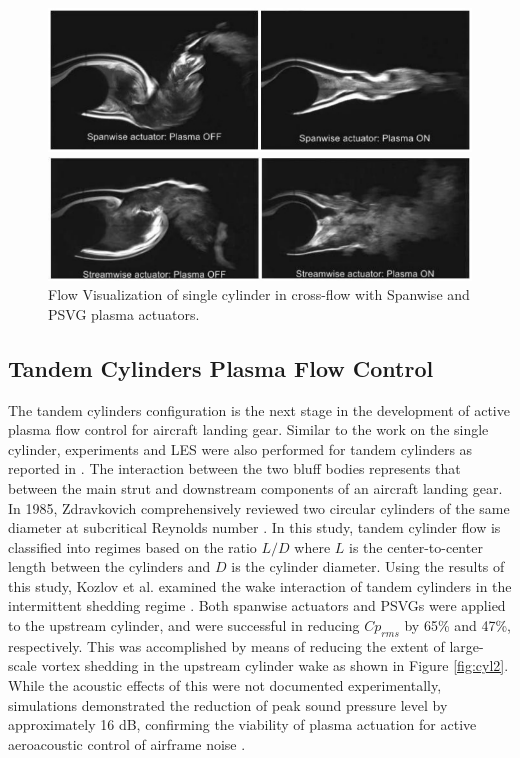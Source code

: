\begin{figure}
	\begin{center}
		\centerline{\includegraphics[scale=1.0]{figures/single_span.pdf}}
		\centerline{\includegraphics[scale=1.0]{figures/single_psvg.pdf}}
		\caption{Flow Visualization of single cylinder in cross-flow with Spanwise and PSVG plasma actuators.}
		\label{fig:cyl1}
	\end{center}
\end{figure}


\subsection{Tandem Cylinders Plasma Flow Control}

The tandem cylinders configuration is the next stage in the development of active plasma flow control for aircraft landing gear. Similar to the work on the single cylinder, experiments and LES were also performed for tandem cylinders as reported in \cite{eltaweel2014} \cite{khorrami2005} \cite{kozlov20112}. The interaction between the two bluff bodies represents that between the main strut and downstream components of an aircraft landing gear. In 1985, Zdravkovich comprehensively reviewed two circular cylinders of the same diameter at subcritical Reynolds number \cite{zdravkovich1985}. In this study, tandem cylinder flow is classified into regimes based on the ratio $L/D$ where $L$ is the center-to-center length between the cylinders and $D$ is the cylinder diameter. Using the results of this study, Kozlov et al. examined the wake interaction of tandem cylinders in the intermittent shedding regime \cite{kozlov20112}. Both spanwise actuators and PSVGs were applied to the upstream cylinder, and were successful in reducing $Cp_{rms}$ by 65\% and 47\%, respectively. This was accomplished by means of reducing the extent of large-scale vortex shedding in the upstream cylinder wake as shown in Figure \ref{fig:cyl2}. While the acoustic effects of this were not documented experimentally, simulations demonstrated the reduction of peak sound pressure level by approximately 16 dB, confirming the viability of plasma actuation for active aeroacoustic control of airframe noise \cite{eltaweel2014}.

